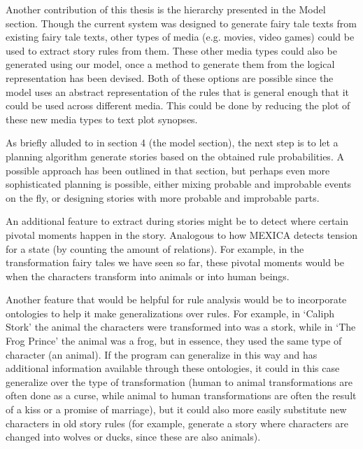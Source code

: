 Another contribution of this thesis is the hierarchy presented in the Model
section. Though the current system was designed to generate fairy tale texts
from existing fairy tale texts, other types of media (e.g. movies, video
games) could be used to extract story rules from them.
These other media types could also be generated using our model, once a method
to generate them from the logical representation has been devised. Both of
these options are possible since the model uses an abstract representation of the
rules that is general enough that it could be used across different media.
This could be done by reducing the plot of these new media types to text plot
synopses.

As briefly alluded to in section 4 (the model section), the next step is to let a planning
algorithm generate stories based on the obtained rule probabilities. A possible
approach has been outlined in that section, but perhaps even more sophisticated
planning is possible, either mixing probable and improbable events on the fly,
or designing stories with more probable and improbable parts. 

An additional
feature to extract during stories might be to detect where certain pivotal
moments happen in the story. Analogous to how MEXICA detects tension for a state
(by counting the amount of relations). For example, in the transformation fairy tales we
have seen so far, these pivotal moments would be when the characters transform
into animals or into human beings.

Another feature that would be helpful for rule analysis would be to incorporate
ontologies to help it make generalizations over rules.
For example, in `Caliph Stork' the animal the characters were transformed into
was a stork, while in `The Frog Prince' the animal was a frog, but in essence,
they used the same type of character (an animal). If the program can generalize
in this way and has additional information available through these ontologies,
it could in this case generalize over the type of transformation (human to
animal transformations are often done as a curse, while animal to human
transformations are often the result of a kiss or a promise of marriage), but it
could also more easily substitute new characters in old story rules (for
example, generate a story where characters are changed into wolves or ducks,
since these are also animals).

